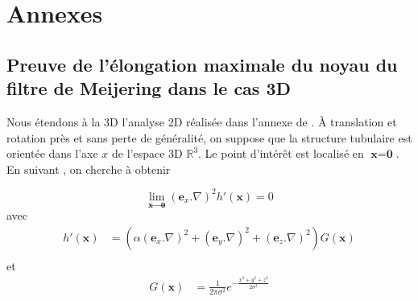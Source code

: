 %
\chapter{Annexes}
\label{sec:appendix}

\section{Preuve de l'élongation maximale du noyau du filtre de Meijering dans le cas 3D}
\label{APP:Proof of Meijering's maximal flatness for 3D case}


Nous étendons à la 3D l'analyse 2D réalisée dans l'annexe de \cite{Meijering2004_neurite_vesselness}.
À translation et rotation près et sans perte de généralité, on suppose que la structure tubulaire est orientée dans l'axe $x$ de l'espace 3D $\mathbb R^3$. Le point d'intérêt est localisé en $\textbf{x} = \textbf{0}$.
En suivant \cite{Meijering2004_neurite_vesselness}, on cherche à obtenir  

\begin{equation}
    \lim_{\textbf{x}\to \textbf{0}} (\textbf{e}_x.\nabla)^2 h'(\textbf{x})=0
    \label{EQ:TOSOLVE}
\end{equation}
avec 
\begin{align}
h'(\textbf{x}) & = (\alpha(\textbf{e}_x.\nabla)^2 + (\textbf{e}_y.\nabla)^2 + (\textbf{e}_z.\nabla)^2)G(\textbf{x}) \nonumber \\
\end{align}
et
\begin{align}
    G(\textbf{x})& = \frac{1}{2 \pi \sigma^2}e^{-\frac{x^2 + y^2 + z^2}{2\sigma^2}} \nonumber \\
\end{align}

